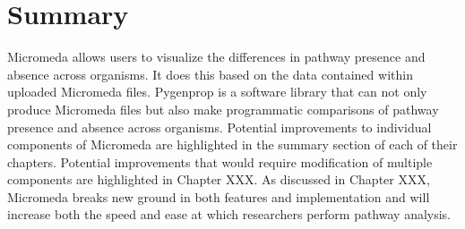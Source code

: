 \section{Summary}

Micromeda allows users to visualize the differences in pathway presence and absence across organisms. It does this based on the data contained within uploaded Micromeda files. Pygenprop is a software library that can not only produce Micromeda files but also make programmatic comparisons of pathway presence and absence across organisms. Potential improvements to individual components of Micromeda are highlighted in the summary section of each of their chapters. Potential improvements that would require modification of multiple components are highlighted in Chapter XXX. As discussed in Chapter XXX, Micromeda breaks new ground in both features and implementation and will increase both the speed and ease at which researchers perform pathway analysis.
